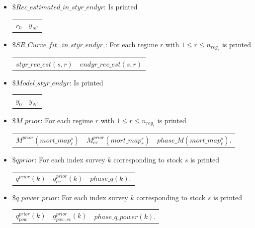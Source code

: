 \documentclass{article}
\begin{document}
\begin{itemize}
\begin{tabular}{c c c}
\end{tabular}

\item $\$ Rec\_estimated\_in\_styr\_endyr$: Is printed 
\begin{center}
    \begin{tabular}{c c}
       $r_0$  & $y_N$.  \\
         \end{tabular}
\end{center}


\item $\$ SR\_Curve\_fit\_\_in\_styr\_endyr\_$:  For each regime $r$ with $1\leq r \leq n_{reg_s}$ is printed \\
\begin{tabular}{c c}
   $styr\_rec\_est(s,r)$  & $endyr\_rec\_est(s,r)$ \\
     
\end{tabular}

\item $\$ Model\_styr\_endyr$: Is printed 
\begin{center}
    \begin{tabular}{c c}
        $y_0$ & $y_N$.  \\
    \end{tabular}
\end{center}

\item $\$ M\_prior$:  For each regime $r$ with $1\leq r \leq n_{reg_s}$ is printed 
\begin{center}
    \begin{tabular}{c c c}
       $M^{prior}(mort\_map^s_r)$  & $M^{prior}_{cv}(mort\_map^s_r)$ & $phase\_M(mort\_map^s_r)$. \\
    \end{tabular}
\end{center}


\item $\$ qprior$: For each index survey $k$ corresponding to stock $s$ is printed
\begin{center}
    \begin{tabular}{c c c}
        $q^{prior}(k)$ &  $q^{prior}_{cv}(k)$ & $phase\_q(k)$. \\
    \end{tabular}
\end{center}

\item $\$ q\_power\_prior$: For each index survey $k$ corresponding to stock $s$ is printed 
\begin{center}
    \begin{tabular}{c c c}
        $q_{pow}^{prior}(k)$ & $q_{pow,cv}^{prior}(k)$ & $phase\_q\_power(k)$.  \\
        

\end{tabular}
\end{center}
\end{itemize}
\end{document}
